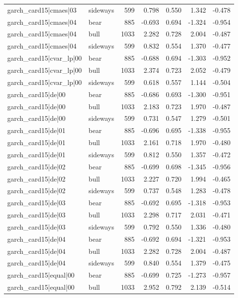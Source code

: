 \begin{table}
\begin{tabular}{llrrrrr}
garch\_card15|cmaes|03 & sideways & 599 & 0.798 & 0.550 & 1.342 & -0.478 \\
garch\_card15|cmaes|04 & bear & 885 & -0.693 & 0.694 & -1.324 & -0.954 \\
garch\_card15|cmaes|04 & bull & 1033 & 2.282 & 0.728 & 2.004 & -0.487 \\
garch\_card15|cmaes|04 & sideways & 599 & 0.832 & 0.554 & 1.370 & -0.477 \\
garch\_card15|cvar\_lp|00 & bear & 885 & -0.688 & 0.694 & -1.303 & -0.952 \\
garch\_card15|cvar\_lp|00 & bull & 1033 & 2.374 & 0.723 & 2.052 & -0.479 \\
garch\_card15|cvar\_lp|00 & sideways & 599 & 0.618 & 0.557 & 1.144 & -0.504 \\
garch\_card15|de|00 & bear & 885 & -0.686 & 0.693 & -1.300 & -0.951 \\
garch\_card15|de|00 & bull & 1033 & 2.183 & 0.723 & 1.970 & -0.487 \\
garch\_card15|de|00 & sideways & 599 & 0.731 & 0.547 & 1.279 & -0.501 \\
garch\_card15|de|01 & bear & 885 & -0.696 & 0.695 & -1.338 & -0.955 \\
garch\_card15|de|01 & bull & 1033 & 2.161 & 0.718 & 1.970 & -0.480 \\
garch\_card15|de|01 & sideways & 599 & 0.812 & 0.550 & 1.357 & -0.472 \\
garch\_card15|de|02 & bear & 885 & -0.699 & 0.698 & -1.345 & -0.956 \\
garch\_card15|de|02 & bull & 1033 & 2.227 & 0.720 & 1.994 & -0.465 \\
garch\_card15|de|02 & sideways & 599 & 0.737 & 0.548 & 1.283 & -0.478 \\
garch\_card15|de|03 & bear & 885 & -0.692 & 0.695 & -1.318 & -0.953 \\
garch\_card15|de|03 & bull & 1033 & 2.298 & 0.717 & 2.031 & -0.471 \\
garch\_card15|de|03 & sideways & 599 & 0.792 & 0.550 & 1.336 & -0.480 \\
garch\_card15|de|04 & bear & 885 & -0.692 & 0.694 & -1.321 & -0.953 \\
garch\_card15|de|04 & bull & 1033 & 2.282 & 0.728 & 2.004 & -0.487 \\
garch\_card15|de|04 & sideways & 599 & 0.840 & 0.554 & 1.379 & -0.475 \\
garch\_card15|equal|00 & bear & 885 & -0.699 & 0.725 & -1.273 & -0.957 \\
garch\_card15|equal|00 & bull & 1033 & 2.952 & 0.792 & 2.139 & -0.514 \\

\end{tabular}
\end{table}
